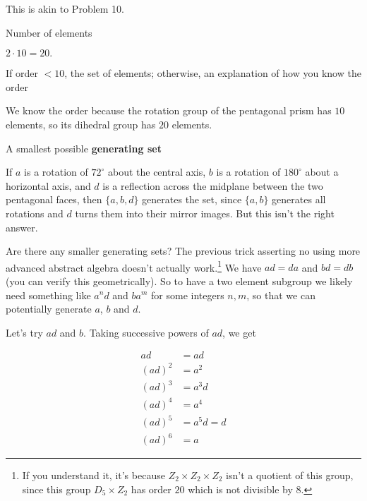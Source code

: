 \documentclass[../gatm_answers.tex]{subfiles}
\begin{document}
\noindent This is akin to Problem 10.

\begin{inner_problem}[start=1]
\item Number of elements
\end{inner_problem}

\noindent$2\cdot 10=20.$

\begin{inner_problem}
\item If order $< 10$, the set of elements; otherwise, an explanation of how you know the order
\end{inner_problem}

\noindent We know the order because the rotation group of the pentagonal prism has $10$ elements, so its dihedral group has $20$ elements.

\begin{inner_problem}
\item A smallest possible \textbf{generating set}
\end{inner_problem}

\noindent If $a$ is a rotation of $72^\circ$ about the central axis, $b$ is a rotation of $180^\circ$ about a horizontal axis, and $d$ is a reflection across the midplane between the two pentagonal faces, then $\{a,b,d\}$ generates the set, since $\{a,b\}$ generates all rotations and $d$ turns them into their mirror images. But this isn't the right answer.

Are there any smaller generating sets? The previous trick asserting no using more advanced abstract algebra doesn't actually work.\footnote{If you understand it, it's because $Z_2\times Z_2\times Z_2$ isn't a quotient of this group, since this group $D_5 \times Z_2$ has order $20$ which is not divisible by $8$.} We have $ad=da$ and $bd=db$ (you can verify this geometrically). So to have a two element subgroup we likely need something like $a^nd$ and $ba^m$ for some integers $n,m$, so that we can potentially generate $a$, $b$ and $d$.

Let's try $ad$ and $b$. Taking successive powers of $ad$, we get

\begin{align*}
ad &= ad \\
(ad)^2 &= a^2 \\
(ad)^3 &= a^3d \\
(ad)^4 &= a^4 \\
(ad)^5 &= a^5d = d \\
(ad)^6 &= a
\end{align*}
\end{document}

